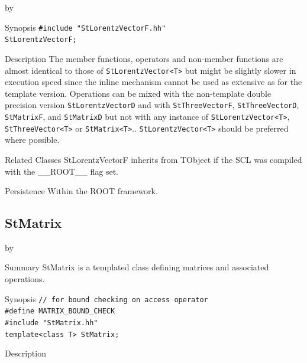 \documentclass[twoside]{article}
\newcommand{\name}[1]{\textsf{#1}}%
\newcommand{\entrylabel}[1]{\mbox{\textbf{{#1}}}\hfil}%
\newenvironment{entry}
{\begin{list}{}%
    {\renewcommand{\makelabel}{\entrylabel}%
     \setlength{\labelwidth}{90pt}%
     \setlength{\leftmargin}{\labelwidth}
     \advance\leftmargin by \labelsep%
      }%
    }%
  {\end{list}}
\newcommand{\Entrylabel}[1]%
{\raisebox{0pt}[1ex][0pt]{\makebox[\labelwidth][l]%
    {\parbox[t]{\labelwidth}{\hspace{0pt}\textbf{{#1}}}}}}
\newenvironment{Entry}%
{\renewcommand{\entrylabel}{\Entrylabel}\begin{entry}}%
  {\end{entry}}
\begin{document}
\begin{description}
\begin{Entry}
\item[Synopsis]
    \verb+#include "StLorentzVectorF.hh"+ \\
    \verb+StLorentzVectorF;+
    
    
\item[Description]       
    The member functions, operators and non-member functions are almost identical
    to those of \verb+StLorentzVector<T>+ but might be slightly slower in execution speed
    since the inline mechanism cannot be used as extensive as for the template
    version. Operations can be mixed with the non-template double precision version
    \texttt{StLorentzVectorD} and with \texttt{StThreeVectorF}, \texttt{StThreeVectorD},
    \texttt{StMatrixF}, and \texttt{StMatrixD}
    but not with any instance of \verb+StLorentzVector<T>+, \verb+StThreeVector<T>+ or
    \verb+StMatrix<T>+..
    \verb+StLorentzVector<T>+ should be preferred where possible.

\item[Related Classes]
    StLorentzVectorF inherits from TObject 
    if the SCL was compiled with the \name{\_\_ROOT\_\_} flag set.
    
\item[Persistence]
    Within the ROOT framework.

\end{Entry}

\clearpage

%
%
\subsection{StMatrix } \label{StMatrix}
\begin{Entry}
\item[Summary]
    StMatrix is a templated class defining
    matrices and associated operations.

\item[Synopsis]
  \verb+// for bound checking on access operator+\\
  \verb+#define MATRIX_BOUND_CHECK+ \\
  \verb+#include "StMatrix.hh"+ \\
  \verb+template<class T> StMatrix;+
  
    
\item[Description]   
    

\end{Entry}
\end{description}
\end{document}
